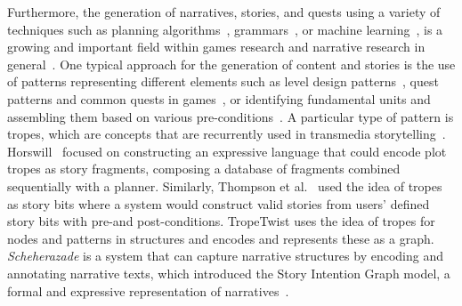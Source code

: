 Furthermore, the generation of narratives, stories, and quests using a variety of techniques such as planning algorithms~, grammars~, or machine learning~, is a growing and important field within games research and narrative research in general~. One typical approach for the generation of content and stories is the use of patterns representing different elements such as level design patterns~, quest patterns and common quests in games~, or identifying fundamental units and assembling them based on various pre-conditions~. A particular type of pattern is tropes, which are concepts that are recurrently used in transmedia storytelling~. Horswill~ focused on constructing an expressive language that could encode plot tropes as story fragments, composing a database of fragments combined sequentially with a planner. Similarly, Thompson et al.~ used the idea of tropes as story bits where a system would construct valid stories from users' defined story bits with pre-and post-conditions. TropeTwist uses the idea of tropes for nodes and patterns in structures and encodes and represents these as a graph. \emph{Scheherazade} is a system that can capture narrative structures by encoding and annotating narrative texts, which introduced the Story Intention Graph model, a formal and expressive representation of narratives~.







